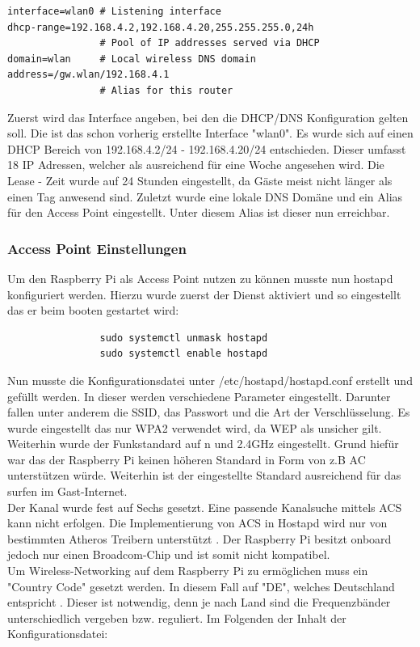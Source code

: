 \documentclass[a4paper,11pt,singlespacing]{article}
\begin{document}
            
                \begin{lstlisting}
interface=wlan0 # Listening interface
dhcp-range=192.168.4.2,192.168.4.20,255.255.255.0,24h
                # Pool of IP addresses served via DHCP
domain=wlan     # Local wireless DNS domain
address=/gw.wlan/192.168.4.1
                # Alias for this router
                \end{lstlisting}  
                Zuerst wird das Interface angeben, bei den die DHCP/DNS Konfiguration gelten soll. Die ist das schon vorherig erstellte Interface "wlan0". Es wurde sich auf einen DHCP Bereich von 192.168.4.2/24 - 192.168.4.20/24 entschieden. Dieser umfasst 18 IP Adressen, welcher als ausreichend für eine Woche angesehen wird. Die Lease - Zeit wurde auf 24 Stunden eingestellt, da Gäste meist nicht länger als einen Tag anwesend sind.
                Zuletzt wurde eine lokale DNS Domäne und ein Alias für den Access Point eingestellt. Unter diesem Alias ist dieser nun erreichbar.


            \subsubsection{Access Point Einstellungen}
                Um den Raspberry Pi als Access Point nutzen zu können musste nun hostapd konfiguriert werden. Hierzu wurde zuerst der Dienst aktiviert und so eingestellt das er beim booten gestartet wird:
                  \begin{lstlisting}
                sudo systemctl unmask hostapd
                sudo systemctl enable hostapd
                  \end{lstlisting} 
                
                    Nun musste die Konfigurationsdatei unter /etc/hostapd/hostapd.conf erstellt und gefüllt werden.
                    In dieser werden verschiedene Parameter eingestellt. Darunter fallen unter anderem die SSID, das Passwort und die Art der Verschlüsselung. Es wurde eingestellt das nur WPA2 verwendet wird, da WEP als unsicher gilt. Weiterhin wurde der Funkstandard auf n und 2.4GHz eingestellt. Grund hiefür war das der Raspberry Pi keinen höheren Standard in Form von z.B AC unterstützen würde. Weiterhin ist der eingestellte Standard ausreichend  für das surfen im Gast-Internet. \\
                    Der Kanal wurde fest auf Sechs gesetzt. Eine passende Kanalsuche mittels ACS kann nicht erfolgen. Die Implementierung von ACS in Hostapd wird nur von bestimmten Atheros Treibern unterstützt \cite{Quote_hostapdACS}. Der Raspberry Pi besitzt onboard jedoch nur einen Broadcom-Chip  \cite{Quote_Raspberrypi3b} und ist somit nicht kompatibel. \\
                    Um Wireless-Networking auf dem Raspberry Pi zu ermöglichen muss ein "Country Code" gesetzt werden. In diesem Fall auf "DE", welches Deutschland entspricht \cite{Quote_hostapdDE}. Dieser ist notwendig, denn je nach Land sind die Frequenzbänder unterschiedlich vergeben bzw. reguliert. Im Folgenden der Inhalt der Konfigurationsdatei:
 
\end{document}
